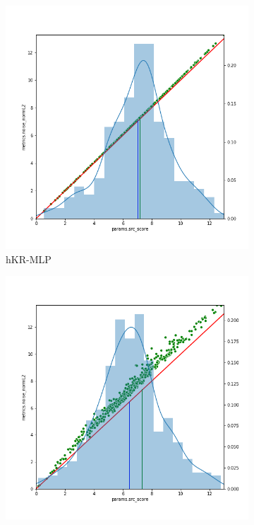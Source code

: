 \documentclass{article}
\begin{document}
\begin{figure}
\centering
\begin{subfigure}{.3\textwidth}
  \centering
  \includegraphics[width=1\linewidth]{img/deepfool_vs_score_DeepFool_Regularized_OT_MLP_new.png}
  \caption{hKR-MLP}
  \label{fig:l2norm_MLP_wass}
\end{subfigure}%
\begin{subfigure}{.3\textwidth}
  \centering
  \includegraphics[width=1\linewidth]{img/deepfool_vs_score_DeepFool_Regularized_OT_VGG_new.png}

\end{subfigure}
\end{figure}
\end{document}
